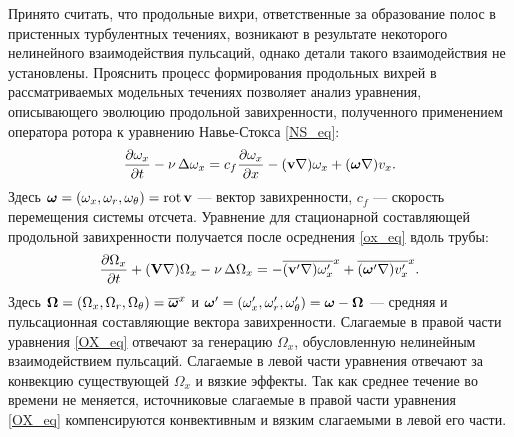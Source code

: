 Принято считать, что продольные вихри, ответственные за образование полос в пристенных турбулентных течениях, возникают в результате некоторого нелинейного взаимодействия пульсаций, однако детали такого взаимодействия не установлены. Прояснить процесс формирования продольных вихрей в рассматриваемых модельных течениях позволяет анализ уравнения, описывающего эволюцию продольной завихренности, полученного применением оператора ротора к уравнению Навье-Стокса \eqref{NS_eq}:
\begin{equation}\label{ox_eq}
\frac{\partial \omega_x}{\partial t} - \nu\mathop{}\!\Delta \omega_x =  c_{f} \frac{\partial \omega_x}{\partial x} -  (\mathbf{v} \nabla) \omega_x + (\mbox{\boldmath$\omega$} \nabla) v_x.
\end{equation}
Здесь $\mbox{\boldmath$\omega$} = (\omega_x, \omega_r, \omega_\theta) = \mathop{}\!\operatorname{rot} \mathbf{v}$ --- вектор завихренности, $c_{f}$ --- скорость перемещения системы отсчета. Уравнение для стационарной составляющей продольной завихренности получается после осреднения \eqref{ox_eq} вдоль трубы:
\begin{equation}\label{OX_eq}
\frac{\partial \Omega_x}{\partial t} + (\mathbf{V} \nabla) \Omega_x - \nu\mathop{}\!\Delta \Omega_x = - \overline{(\mathbf{v}' \nabla) \omega'_x}^x + \overline{ (\mbox{\boldmath$\omega$}' \nabla) v'_x }^x.
\end{equation}
Здесь  $\mbox{\boldmath$\Omega$}=(\Omega_x, \Omega_r, \Omega_\theta) = \overline{\mbox{\boldmath$\omega$}}^x$ и $\mbox{\boldmath$\omega$}'=(\omega'_x, \omega'_r, \omega'_\theta) = \mbox{\boldmath$\omega$} - \mbox{\boldmath$\Omega$}$ --- средняя и пульсационная составляющие вектора завихренности. Слагаемые в правой части уравнения \eqref{OX_eq} отвечают за генерацию $\Omega_x$, обусловленную нелинейным взаимодействием пульсаций. Слагаемые в левой части уравнения отвечают за конвекцию существующей $\Omega_x$ и вязкие эффекты. Так как среднее течение во времени не меняется, источниковые слагаемые в правой части уравнения \eqref{OX_eq} компенсируются конвективным и вязким слагаемыми в левой его части. 

